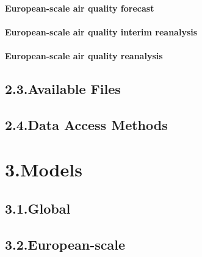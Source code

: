 \documentclass[9pt]{report}
\begin{document}
\paragraph{European-scale air quality forecast}\label{sec-european-scale-air-quality-forecast}%

\paragraph{European-scale air quality interim reanalysis}\label{sec-european-scale-air-quality-interim-reanalysis}%

\paragraph{European-scale air quality reanalysis}\label{sec-european-scale-air-quality-reanalysis}%

\subsection{2.3.\hspace*{0.5em}Available Files}\label{sec-available-files}%

\subsection{2.4.\hspace*{0.5em}Data Access Methods}\label{sec-data-access-methods}%

\section{3.\hspace*{0.5em}Models}\label{sec-models}%

\subsection{3.1.\hspace*{0.5em}Global}\label{sec-global}%

\subsection{3.2.\hspace*{0.5em}European-scale}\label{sec-european-scale}%
\end{document}

